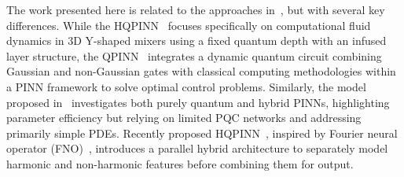 The work presented here is related to the approaches in~\cite{sedykh2024hybrid,dehaghani2024hybrid,trahan2024quantum,leong2025hybrid}, but with several key differences. While the HQPINN~\cite{sedykh2024hybrid} focuses specifically on computational fluid dynamics in 3D Y-shaped mixers using a fixed quantum depth with an infused layer structure, the QPINN~\cite{dehaghani2024hybrid} integrates a dynamic quantum circuit combining Gaussian and non-Gaussian gates with classical computing methodologies within a PINN framework to solve optimal control problems. Similarly, the model proposed in~\cite{trahan2024quantum} investigates both purely quantum and hybrid PINNs, highlighting parameter efficiency but relying on limited PQC networks and addressing primarily simple PDEs. Recently proposed HQPINN~\cite{leong2025hybrid}, inspired by Fourier neural operator (FNO)~\cite{li2020fourier}, introduces a parallel hybrid architecture to separately model harmonic and non-harmonic features before combining them for output.